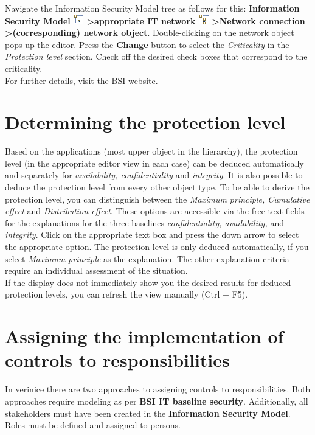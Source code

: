 \documentclass[a4paper,10pt]{book}
\begin{document}
Navigate the Information Security Model tree as follows for this:
\textbf{Information Security Model
\includegraphics[height=2ex]{Icon/GS_Modell.png} \textgreater appropriate IT network
\includegraphics[height=2ex]{Icon/GS_Modell.png}
\textgreater Network connection \textgreater (corresponding) network object}.
Double-clicking on the network object pops up the editor. Press the \textbf{Change} button to select the
{\em Criticality} in the {\em Protection level} section. Check off the desired check boxes that correspond to the criticality.
\newline\\
For further details, visit the \href{https://www.bsi.bund.de/cln_156/ContentBSI/grundschutz/webkurs/gskurs/seiten/s4000_htm.html}{BSI website}.

\section{Determining the protection level}
Based on the applications (most upper object in the hierarchy), the protection level (in the appropriate editor view in each case) can be deduced
automatically and separately for {\em availability, confidentiality} and {\em integrity}. It is also possible to deduce the protection level from
every other object type. To be able to derive the protection level, you can distinguish between the {\em Maximum principle, Cumulative effect} and
{\em Distribution effect}. These options are accessible via the free text fields for the explanations for the three baselines
{\em confidentiality, availability,} and {\em integrity}. Click on the appropriate text box and press the down arrow to select
the appropriate option. The protection level is only deduced automatically, if you select {\em Maximum principle}
as the explanation. The other explanation criteria require an individual assessment of the situation.
\newline\\
If the display does not immediately show you the desired results for deduced protection levels, you can refresh the view
manually (Ctrl + F5).

\section{Assigning the implementation of controls to responsibilities}
In verinice there are two approaches to assigning controls to responsibilities.
Both approaches require modeling as per \textbf{BSI IT baseline security}. Additionally, all stakeholders must have been created in the
\textbf{Information Security Model}. Roles must be defined and assigned to persons.
\end{document}

